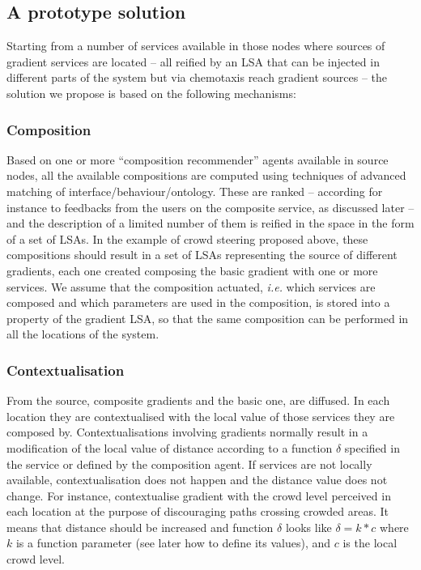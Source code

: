 \documentclass[12pt,a4paper,twoside,openright]{book}
\begin{document}
\subsection{A prototype solution}
Starting from a number of services available in those nodes where sources of gradient services are located -- all reified by an LSA that can be injected in different parts of the system but via chemotaxis reach gradient sources -- the solution we propose is based on the following mechanisms:

\subsubsection{Composition}
Based on one or more ``composition recommender'' agents available in source nodes, all the available compositions are computed using techniques of advanced matching of interface/behaviour/ontology. These are ranked -- according for instance to feedbacks  from the users on the composite service, as discussed later --  and the description of a limited number of them is reified in the space in the form of a set of LSAs. 
%
In the example of crowd steering proposed above, these compositions should result in a set of LSAs representing the source of different gradients, each one created composing the basic gradient with one or more services. We assume that the composition actuated, \emph{i.e.} which services are composed and which parameters are used in the composition, is stored into a property of the gradient LSA, so that the same composition can be performed in all the locations of the system.

\subsubsection{Contextualisation}
From the source, composite gradients and the basic one, are diffused. In each location they are contextualised with the local value of those services they are composed by. 
%
Contextualisations involving gradients normally result in a modification of the local value of distance according to a function $\delta$ specified in the service or defined by the composition agent. 
%
If services are not locally available, contextualisation does not happen and the distance value does not change. 
%
For instance, contextualise gradient  with the crowd level perceived in each location at the purpose of discouraging paths crossing crowded areas. It means that distance should be increased and function $\delta$  looks like $\delta = k * c$ where $k$ is a function parameter (see later how to define its values), and $c$ is the local crowd level. 
\end{document}
